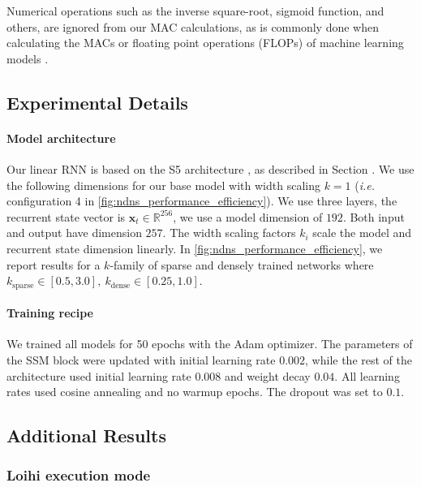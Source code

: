 Numerical operations such as the inverse square-root, sigmoid function, and others, are ignored from our MAC calculations, as is commonly done when calculating the MACs or floating point operations (FLOPs) of machine learning models \cite{evci_rigging_2020}.

\subsection{Experimental Details}

\paragraph{Model architecture}
\label{app:model-params}

Our linear RNN is based on the S5 architecture \cite{DBLP:conf/iclr/SmithWL23}, as described in Section . We use the following dimensions for our base model with width scaling $k=1$ (\textit{i.e.} configuration \qty{4}{} in \autoref{fig:ndns_performance_efficiency}). We use three layers, the recurrent state vector is $\mathbf{x}_t \in \mathbb{R}^{256}$, we use a model dimension of $192$. 
Both input and output have dimension $257$.
The width scaling factors $k_i$ scale the model and recurrent state dimension linearly. In \autoref{fig:ndns_performance_efficiency}, we report results for a $k$-family of sparse and densely trained networks where $k_\text{sparse} \in [0.5, 3.0], \ k_\text{dense} \in [0.25, 1.0]$.

\paragraph{Training recipe}
We trained all models for \qty{50}{} epochs with the Adam optimizer. The parameters of the SSM block were updated with initial learning rate $0.002$, while the rest of the architecture used initial learning rate $0.008$ and weight decay $0.04$. All learning rates used cosine annealing and no warmup epochs.
The dropout was set to $0.1$.


\subsection{Additional Results}

\subsubsection{Loihi execution mode}
\label{app:exmode}

